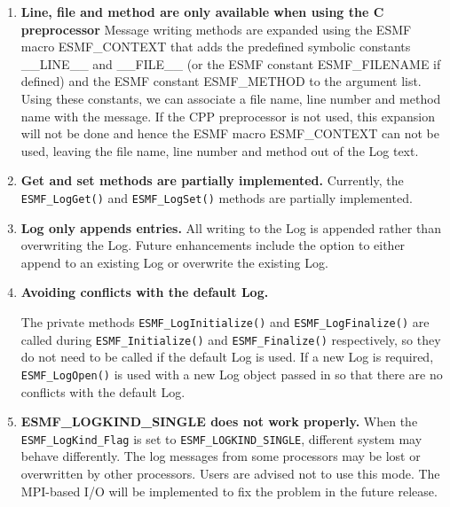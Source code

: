 %

\begin{enumerate}

\item {\bf Line, file and method are only available when using the C 
preprocessor}
Message writing methods are expanded using the ESMF macro ESMF\_CONTEXT 
that adds the predefined symbolic constants \_\_LINE\_\_ and \_\_FILE\_\_ (or 
the ESMF constant ESMF\_FILENAME if defined) and the ESMF constant ESMF\_METHOD 
to the argument list.  Using these constants, we can associate a file name, 
line number and method name with the message.  If the CPP preprocessor is not 
used, this expansion will not be done and hence the ESMF macro ESMF\_CONTEXT 
can not be used, leaving the file name, line number and method out of the Log 
text.

\item{\bf Get and set methods are partially implemented.}
Currently, the {\tt ESMF\_LogGet()} and {\tt ESMF\_LogSet()} methods are 
partially implemented.   

\item{\bf Log only appends entries.}
All writing to the Log is appended rather than overwriting the Log.  Future 
enhancements include the option to either append to an existing Log or 
overwrite the existing Log.

\item{\bf Avoiding conflicts with the default Log.}
\begin{sloppypar}
The private methods {\tt ESMF\_LogInitialize()} and {\tt ESMF\_LogFinalize()} 
are called during {\tt ESMF\_Initialize()} and {\tt ESMF\_Finalize()} 
respectively, so they do not need to be called if the default Log is used. 
If a new Log is required, {\tt ESMF\_LogOpen()} is used with a new Log object 
passed in so that there are no conflicts with the default Log.
\end{sloppypar}

\item{\bf ESMF\_LOGKIND\_SINGLE does not work properly.}
When the {\tt ESMF\_LogKind\_Flag} is set to {\tt ESMF\_LOGKIND\_SINGLE}, different system may behave
differently.  The log messages from some processors may be lost or overwritten
by other processors.  Users are advised not to use this mode.  The MPI-based
I/O will be implemented to fix the problem in the future release. 


\end{enumerate}
